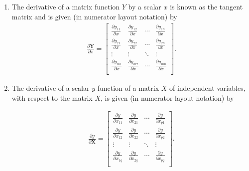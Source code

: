 \documentclass[10pt]{beamer}
\begin{document}
\begin{frame}[allowframebreaks]
\begin{enumerate}
\item The derivative of a matrix function $Y$ by a scalar $x$ is known as the tangent
  matrix and is given (in numerator layout notation) by
  \begin{align*}
    \frac{\partial \mathbf{Y}}{\partial x} = \begin{bmatrix} \frac{\partial y_{11}}{\partial x} & \frac{\partial y_{12}}{\partial x} & \cdots & \frac{\partial y_{1n}}{\partial x}\\ \frac{\partial y_{21}}{\partial x} & \frac{\partial y_{22}}{\partial x} & \cdots & \frac{\partial y_{2n}}{\partial x}\\ \vdots & \vdots & \ddots & \vdots\\ \frac{\partial y_{m1}}{\partial x} & \frac{\partial y_{m2}}{\partial x} & \cdots & \frac{\partial y_{mn}}{\partial x}\\ \end{bmatrix}.
  \end{align*}

\item The derivative of a scalar $y$ function of a matrix $X$ of independent variables, with respect to the matrix $X$, is given (in numerator layout notation) by

  \begin{align*}
    \frac{\partial y}{\partial \mathbf{X}} = \begin{bmatrix} \frac{\partial y}{\partial x_{11}} & \frac{\partial y}{\partial x_{21}} & \cdots & \frac{\partial y}{\partial x_{p1}}\\ \frac{\partial y}{\partial x_{12}} & \frac{\partial y}{\partial x_{22}} & \cdots & \frac{\partial y}{\partial x_{p2}}\\ \vdots & \vdots & \ddots & \vdots\\ \frac{\partial y}{\partial x_{1q}} & \frac{\partial y}{\partial x_{2q}} & \cdots & \frac{\partial y}{\partial x_{pq}}\\ \end{bmatrix}.
  \end{align*}

\end{enumerate}


\end{frame}
\end{document}
